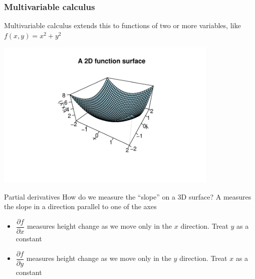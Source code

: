 \documentclass[aspectratio=169]{beamer}\usepackage[]{graphicx}\usepackage[]{xcolor}
\newenvironment{knitrout}{}{} %
\begin{document}
\begin{frame}[fragile]\frametitle{Multivariable calculus}
Multivariable calculus extends this to functions of two or more variables, like $f(x, y) = x^2 + y^2$
\begin{center}
\begin{knitrout}
\color{fgcolor}
\includegraphics[width=0.8\textwidth]{FIGS/L04-fig2d-1} 
\end{knitrout}
\end{center}
\end{frame}


\begin{frame}{Partial derivatives}
  How do we measure the ``slope'' on a 3D surface?
  \vfill
  A  measures the slope in a direction parallel to one of the axes
  \vfill
  \begin{itemize}
    \item $\dfrac{\partial f}{\partial x}$ measures height change as we move only in the $x$ direction. Treat $y$ as a constant
    \vfill
    \item $\dfrac{\partial f}{\partial y}$ measures height change as we move only in the $y$ direction. Treat $x$ as a constant
  \end{itemize}
\end{frame}
\end{document}
